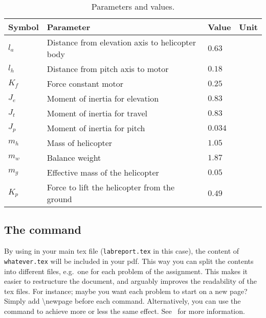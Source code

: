 \begin{table}[tbp]
	\centering
	\caption{Parameters and values.}
	\begin{tabular}{llll}
		\toprule
		Symbol & Parameter & Value & Unit \\
		\midrule
		$l_a$ & Distance from elevation axis to helicopter body & $0.63$  & \meter                      \\
		$l_h$ & Distance from pitch axis to motor               & $0.18$  & \meter                      \\
		$K_f$ & Force constant motor                            & $0.25$  & \newton\per\volt            \\
		$J_e$ & Moment of inertia for elevation                 & $0.83$  & \kilogram\usk\meter\squared \\
		$J_t$ & Moment of inertia for travel                    & $0.83$  & \kilogram\usk\meter\squared \\
		$J_p$ & Moment of inertia for pitch                     & $0.034$ & \kilogram\usk\meter\squared \\
		$m_h$ & Mass of helicopter                              & $1.05$  & \kilogram                   \\
		$m_w$ & Balance weight                                  & $1.87$  & \kilogram                   \\
		$m_g$ & Effective mass of the helicopter                & $0.05$  & \kilogram                   \\
		$K_p$ & Force to lift the helicopter from the ground    & $0.49$  & \newton                     \\
		\bottomrule
	\end{tabular}
\label{tab:parameters}
\end{table}

\subsection{The  command}
By using  in your main tex file (\texttt{labreport.tex} in this case), the content of \texttt{whatever.tex} will be included in your pdf. This way you can split the contents into different files, e.g.~one for each problem of the assignment. This makes it easier to restructure the document, and arguably improves the readability of the tex files. For instance; maybe you want each problem to start on a new page? Simply add \textbackslash{newpage} before each  command. Alternatively, you can use the  command to achieve more or less the same effect. See~\cite{InputVsInclude} for more information.

